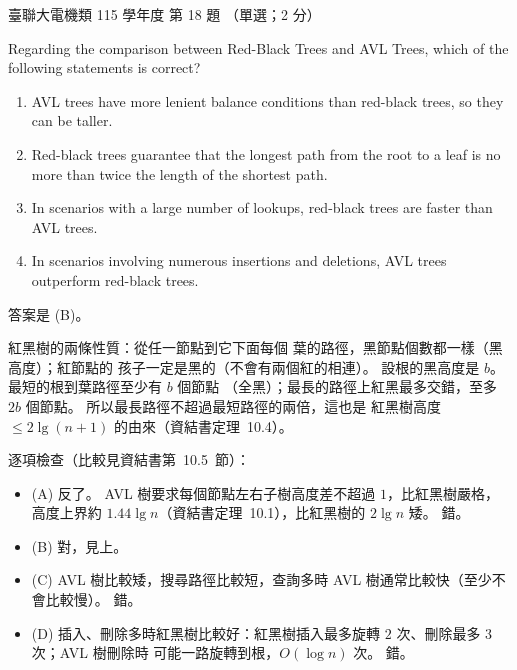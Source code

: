 \begin{pastexam}[label={px:ust-115-ee-ds-18}]{臺聯大電機類 115 學年度 第 18 題}
（單選；2 分）

Regarding the comparison between Red-Black Trees and AVL Trees, which of the following statements
is correct?
\begin{enumerate}[label=(\Alph*)]
\item AVL trees have more lenient balance conditions than red-black trees, so they can be taller.
\item Red-black trees guarantee that the longest path from the root to a leaf is no more than twice
the length of the shortest path.
\item In scenarios with a large number of lookups, red-black trees are faster than AVL trees.
\item In scenarios involving numerous insertions and deletions, AVL trees outperform red-black
trees.
\end{enumerate}
\end{pastexam}

\begin{pastsoln}
答案是 (B)。

紅黑樹的兩條性質：從任一節點到它下面每個 \NIL 葉的路徑，黑節點個數都一樣（黑高度）；紅節點的
孩子一定是黑的（不會有兩個紅的相連）。 設根的黑高度是 $b$。 最短的根到葉路徑至少有 $b$ 個節點
（全黑）；最長的路徑上紅黑最多交錯，至多 $2b$ 個節點。 所以最長路徑不超過最短路徑的兩倍，這也是
紅黑樹高度 $\le 2\lg(n + 1)$ 的由來（資結書定理~10.4）。

逐項檢查（比較見資結書第~10.5~節）：
\begin{itemize}
\item (A) 反了。 AVL 樹要求每個節點左右子樹高度差不超過 $1$，比紅黑樹嚴格，高度上界約
$1.44 \lg n$（資結書定理~10.1），比紅黑樹的 $2 \lg n$ 矮。 錯。
\item (B) 對，見上。
\item (C) AVL 樹比較矮，搜尋路徑比較短，查詢多時 AVL 樹通常比較快（至少不會比較慢）。 錯。
\item (D) 插入、刪除多時紅黑樹比較好：紅黑樹插入最多旋轉 $2$ 次、刪除最多 $3$ 次；AVL 樹刪除時
可能一路旋轉到根，$O(\log n)$ 次。 錯。
\end{itemize}
\end{pastsoln}
